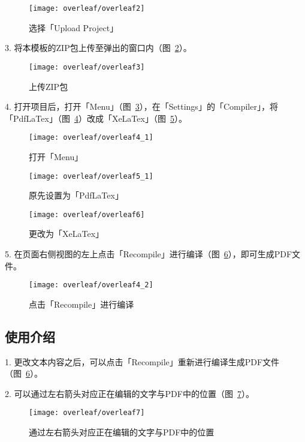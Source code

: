 \begin{figure}
	\centering
	\texttt{[image: overleaf/overleaf2]}
	\caption{选择「Upload Project」}
	\label{fig:overleaf2}
\end{figure}

3. 将本模板的ZIP包上传至弹出的窗口内（图~\ref{fig:overleaf3}）。

\begin{figure}
	\centering
	\texttt{[image: overleaf/overleaf3]}
	\caption{上传ZIP包}
	\label{fig:overleaf3}
\end{figure}

4. 打开项目后，打开「Menu」（图~\ref{fig:overleaf4_1}），在「Settings」的「Compiler」，将「PdfLaTex」（图~\ref{fig:overleaf5_1}）改成「XeLaTex」（图~\ref{fig:overleaf6}）。

\begin{figure}
	\centering
	\texttt{[image: overleaf/overleaf4\_1]}
	\caption{打开「Menu」}
	\label{fig:overleaf4_1}
\end{figure}

\begin{figure}
	\centering
	\texttt{[image: overleaf/overleaf5\_1]}
	\caption{原先设置为「PdfLaTex」}
	\label{fig:overleaf5_1}
\end{figure}

\begin{figure}
	\centering
	\texttt{[image: overleaf/overleaf6]}
	\caption{更改为「XeLaTex」}
	\label{fig:overleaf6}
\end{figure}

5. 在页面右侧视图的左上点击「Recompile」进行编译（图~\ref{fig:overleaf4_2}），即可生成PDF文件。

\begin{figure}
	\centering
	\texttt{[image: overleaf/overleaf4\_2]}
	\caption{点击「Recompile」进行编译}
	\label{fig:overleaf4_2}
\end{figure}

\subsection{使用介绍}

1. 更改文本内容之后，可以点击「Recompile」重新进行编译生成PDF文件（图~\ref{fig:overleaf4_2}）。

2. 可以通过左右箭头对应正在编辑的文字与PDF中的位置（图~\ref{fig:overleaf7}）。

\begin{figure}
	\centering
	\texttt{[image: overleaf/overleaf7]}
	\caption{通过左右箭头对应正在编辑的文字与PDF中的位置}
	\label{fig:overleaf7}
\end{figure}

